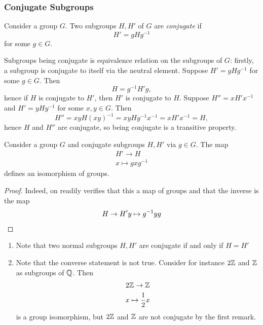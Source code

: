 \subsubsection{Conjugate Subgroups}
    \begin{definition}
        Consider a group $G$. Two subgroups $H,H'$ of $G$ are \emph{conjugate} if 
        $$
            H' = gHg^{-1}
        $$
        for some $g\in G$. 
    \end{definition}
    \begin{remark}
        Subgroups being conjugate is equivalence relation on the subgroups of $G$: firstly, a subgroup is conjugate to itself via the neutral element. Suppose $H' = gHg^{-1}$ for some $g\in G$. Then 
        $$
            H = g^{-1}H'g,
        $$ 
        hence if $H$ is conjugate to $H'$, then $H'$ is conjugate to $H$. Suppose $H'' = xH'x^{-1}$ and $H' = yHy^{-1}$ for some $x,y\in G$. Then 
        $$
            H'' = xyH(xy)^{-1}=xyHy^{-1}x^{-1} = xH'x^{-1}=H,
        $$
        hence $H$ and $H''$ are conjugate, so being conjugate is a transitive property. 
    \end{remark}
    \begin{lemma}\label{ConjugateSubgroupsAreIsomorphic}
        Consider a group $G$ and conjugate subgroups $H,H'$ via $g\in G$. The map 
        \begin{gather*}
            H' \rightarrow H\\
            x \mapsto gxg^{-1} 
        \end{gather*}
        defines an isomorphism of groups.
    \end{lemma}
    \begin{proof}
        Indeed, on readily verifies that this a map of groups and that the inverse is the map 
        $$
            H\rightarrow H'\\
            y \mapsto g^{-1}yg
        $$
    \end{proof}
    \begin{remark}
        \begin{enumerate}
            \item Note that two normal subgroups $H,H'$ are conjugate if and only if $H=H'$ 
            \item Note that the converse statement is not true. Consider for instance $2\mathbb{Z}$ and $\mathbb{Z}$ as subgroups of $\mathbb{Q}$. Then 
        \begin{gather*}
            2\mathbb{Z}\rightarrow \mathbb{Z}\\
            x\mapsto \frac{1}{2}x
        \end{gather*}
        is a group isomorphism, but $2\mathbb{Z}$ and $\mathbb{Z}$ are not conjugate by the first remark. 
        \end{enumerate} 
    \end{remark}
